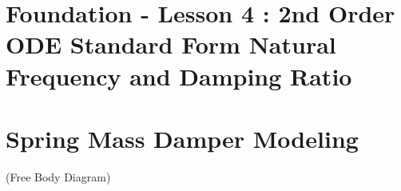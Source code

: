 \documentclass[12pt,a4paper]{article}
\begin{document}
	\section*{\centering Foundation - Lesson 4 : 2nd Order ODE Standard Form Natural Frequency and Damping Ratio}
	
	\section{Spring Mass Damper Modeling}
	(Free Body Diagram)
	
\end{document}
